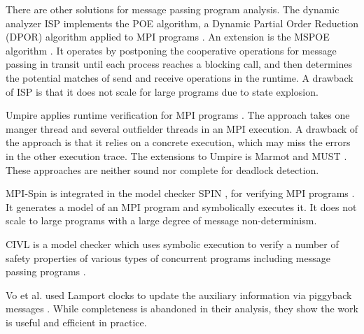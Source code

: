 There are other solutions for message passing program analysis.
The dynamic analyzer ISP implements the POE algorithm, a Dynamic Partial Order Reduction (DPOR) algorithm \cite{DBLP:conf/popl/FlanaganG05} applied to MPI programs \cite{DBLP:conf/ppopp/VakkalankaSGK08}. 
An extension is the MSPOE algorithm \cite{DBLP:conf/sbmf/SharmaGB12}. It operates by postponing the cooperative operations for message passing in transit until each process reaches a blocking call, and then determines the potential matches of send and receive operations in the runtime. 
A drawback of ISP is that it does not scale for large programs due to state explosion.

Umpire applies runtime verification for MPI programs \cite{DBLP:conf/sc/VetterS00}. The approach takes one manger thread and several outfielder threads in an MPI execution. A drawback of the approach is that it relies on a concrete execution, which may miss the errors in the other execution trace.
The extensions to Umpire is Marmot \cite{DBLP:conf/parco/KrammerBMR03} and MUST \cite{DBLP:conf/ptw/HilbrichSSM09}. These approaches are neither sound nor complete for deadlock detection. 


MPI-Spin is integrated in the model checker SPIN \cite{DBLP:journals/tse/Holzmann97}, for verifying MPI programs \cite{DBLP:conf/vmcai/Siegel07,DBLP:conf/pvm/Siegel07}. It generates a model of an MPI program and symbolically executes it. It does not scale to large programs with a large degree of message non-determinism.

CIVL is a model checker which uses symbolic execution to verify a number of safety properties of various types of concurrent programs including message passing programs \cite{DBLP:conf/kbse/ZhengRLDS15,DBLP:conf/sc/SiegelZLZMEDR15}.

Vo et al. used Lamport clocks to update the auxiliary information via piggyback messages \cite{DBLP:conf/sc/VoAGSSB10,DBLP:conf/IEEEpact/VoGKSSB11}. While completeness is abandoned in their analysis, they show the work is useful and efficient in practice. 



